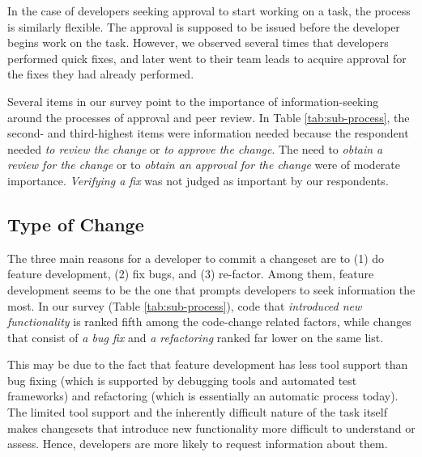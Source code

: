 \documentclass[12pt,oneside]{book}
\begin{document}
In the case of developers seeking approval to start working on a task, the process is similarly flexible. The approval is supposed to be issued before the developer begins work on the task. However, we observed several times that developers performed quick fixes, and later went to their team leads to acquire approval for the fixes they had already performed.

Several items in our survey point to the importance of information-seeking around the processes of approval and peer review. In Table \ref{tab:sub-process}, the second- and third-highest items were information needed because the respondent needed \emph{to review the change} or \emph{to approve the change}. The need to  \emph{obtain a review for the change} or to \emph{obtain an approval for the change} were of moderate importance. \emph{Verifying a fix} was not judged as important by our respondents.

\subsection{Type of Change}

The three main reasons for a developer to commit a changeset are to (1) do feature development, (2) fix bugs, and (3) re-factor. Among them, feature development seems to be the one that prompts developers to seek information the most.
In our survey (Table \ref{tab:sub-process}), code that \emph{introduced new functionality} is ranked fifth among the code-change related factors, while changes that consist of \emph{a bug fix} and \emph{a refactoring} ranked far lower on the same list.

This may be due to the fact that feature development has less tool support than bug fixing (which is supported by debugging tools and automated test frameworks) and refactoring (which is essentially an automatic process today). The limited tool support and the inherently difficult nature of the task itself makes changesets that introduce new functionality more difficult to understand or assess. Hence, developers are more likely to request information about them.



\end{document}
